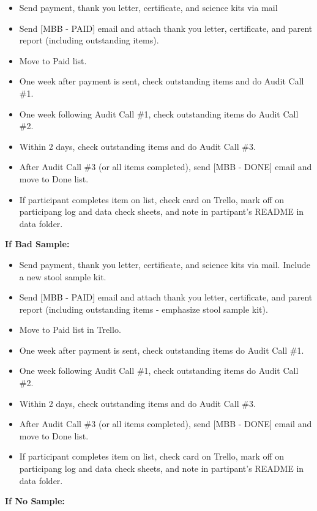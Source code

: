 \documentclass[]{book}
\begin{document}
\begin{itemize}
\item
  Send payment, thank you letter, certificate, and science kits via mail
\item
  Send {[}MBB - PAID{]} email and attach thank you letter, certificate, and parent report (including outstanding items).
\item
  Move to Paid list.
\item
  One week after payment is sent, check outstanding items and do Audit Call \#1.
\item
  One week following Audit Call \#1, check outstanding items do Audit Call \#2.
\item
  Within 2 days, check outstanding items and do Audit Call \#3.
\item
  After Audit Call \#3 (or all items completed), send {[}MBB - DONE{]} email and move to Done list.
\item
  If participant completes item on list, check card on Trello, mark off on participang log and data check sheets, and note in partipant's README in data folder.
\end{itemize}

\textbf{If Bad Sample:}

\begin{itemize}
\item
  Send payment, thank you letter, certificate, and science kits via mail. Include a new stool sample kit.
\item
  Send {[}MBB - PAID{]} email and attach thank you letter, certificate, and parent report (including outstanding items - emphasize stool sample kit).
\item
  Move to Paid list in Trello.
\item
  One week after payment is sent, check outstanding items do Audit Call \#1.
\item
  One week following Audit Call \#1, check outstanding items do Audit Call \#2.
\item
  Within 2 days, check outstanding items and do Audit Call \#3.
\item
  After Audit Call \#3 (or all items completed), send {[}MBB - DONE{]} email and move to Done list.
\item
  If participant completes item on list, check card on Trello, mark off on participang log and data check sheets, and note in partipant's README in data folder.
\end{itemize}

\textbf{If No Sample:}
\end{document}

